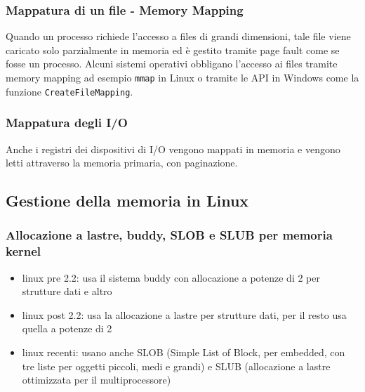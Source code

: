 \documentclass[a4paper]{article}
\begin{document}
\subsubsection*{Mappatura di un file - Memory Mapping}
Quando un processo richiede l'accesso a files di grandi dimensioni, tale file viene caricato solo parzialmente in memoria ed è
gestito tramite page fault come se fosse un processo. Alcuni sistemi operativi obbligano l'accesso ai files tramite memory mapping
ad esempio \verb|mmap| in Linux o tramite le API in Windows come la funzione \verb|CreateFileMapping|.

\subsubsection*{Mappatura degli I/O}
Anche i registri dei dispositivi di I/O vengono mappati in memoria e vengono letti attraverso la memoria primaria, con paginazione.

\newpage


\subsection{Gestione della memoria in Linux}
\subsubsection*{Allocazione a lastre, buddy, SLOB e SLUB per memoria kernel}
\begin{itemize}
	\item linux pre 2.2: usa il sistema buddy con allocazione a potenze di 2 per strutture dati e altro
	\item linux post 2.2: usa la allocazione a lastre per strutture dati, per il resto usa quella a potenze di 2
	\item linux recenti: usano anche SLOB (Simple List of Block, per embedded, con tre liste per oggetti piccoli, medi e grandi)
	e SLUB (allocazione a lastre ottimizzata per il multiprocessore)
\end{itemize}
\end{document}
